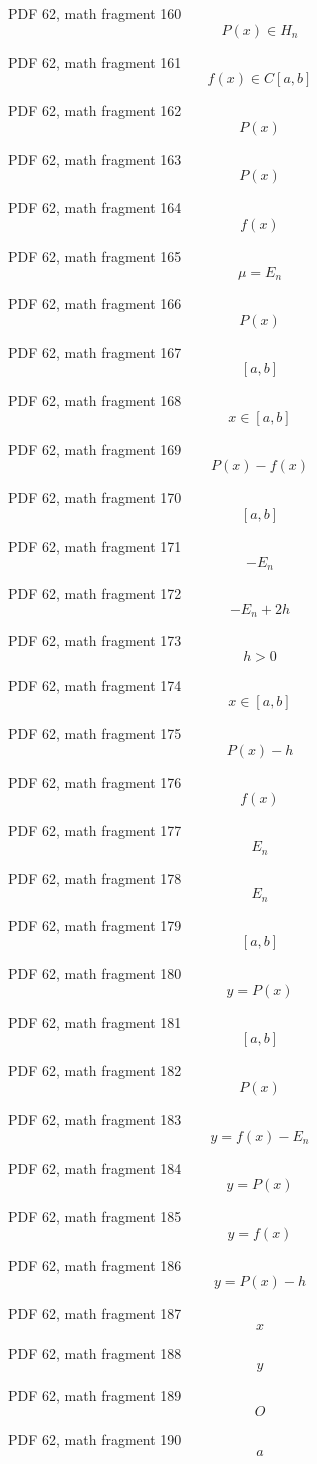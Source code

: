 \documentclass[UTF8,fontset=fandol]{ctexart}
\begin{document}
\par
PDF 62, math fragment 160
\[P(x) \in H_n\]
\par
PDF 62, math fragment 161
\[f(x) \in C[a,b]\]
\par
PDF 62, math fragment 162
\[P(x)\]
\par
PDF 62, math fragment 163
\[P(x)\]
\par
PDF 62, math fragment 164
\[f(x)\]
\par
PDF 62, math fragment 165
\[\mu = E_n\]
\par
PDF 62, math fragment 166
\[P(x)\]
\par
PDF 62, math fragment 167
\[[a,b]\]
\par
PDF 62, math fragment 168
\[x \in [a,b]\]
\par
PDF 62, math fragment 169
\[P(x) - f(x)\]
\par
PDF 62, math fragment 170
\[[a,b]\]
\par
PDF 62, math fragment 171
\[-E_n\]
\par
PDF 62, math fragment 172
\[-E_n + 2h\]
\par
PDF 62, math fragment 173
\[h > 0\]
\par
PDF 62, math fragment 174
\[x \in [a,b]\]
\par
PDF 62, math fragment 175
\[P(x) - h\]
\par
PDF 62, math fragment 176
\[f(x)\]
\par
PDF 62, math fragment 177
\[E_n\]
\par
PDF 62, math fragment 178
\[E_n\]
\par
PDF 62, math fragment 179
\[[a,b]\]
\par
PDF 62, math fragment 180
\[y = P(x)\]
\par
PDF 62, math fragment 181
\[[a,b]\]
\par
PDF 62, math fragment 182
\[P(x)\]
\par
PDF 62, math fragment 183
\[y = f(x) - E_n\]
\par
PDF 62, math fragment 184
\[y = P(x)\]
\par
PDF 62, math fragment 185
\[y = f(x)\]
\par
PDF 62, math fragment 186
\[y = P(x) - h\]
\par
PDF 62, math fragment 187
\[x\]
\par
PDF 62, math fragment 188
\[y\]
\par
PDF 62, math fragment 189
\[O\]
\par
PDF 62, math fragment 190
\[a\]
\par
\end{document}
